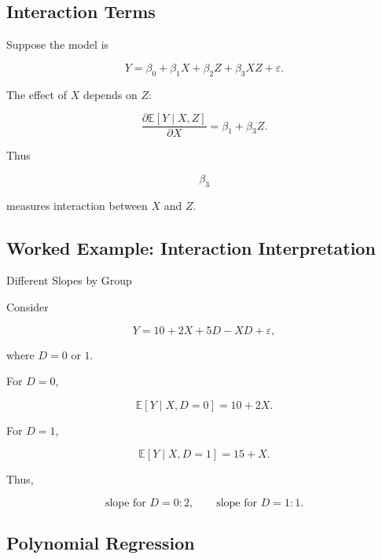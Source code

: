 \subsection{Interaction Terms}
\label{subsec:interaction-terms}

Suppose the model is

\[
\boxed{
Y
=
\beta_0
+
\beta_1X
+
\beta_2Z
+
\beta_3XZ
+
\varepsilon.
}
\]

The effect of \(X\) depends on \(Z\):

\[
\frac{
\partial
\mathbb{E}[Y\mid X,Z]
}{
\partial X
}
=
\boxed{
\beta_1+\beta_3Z.
}
\]

Thus

\[
\beta_3
\]

measures interaction between \(X\) and \(Z\).

\subsection{Worked Example: Interaction Interpretation}
\label{subsec:worked-interaction}

\begin{workedexamplebox}{Different Slopes by Group}

Consider

\[
Y
=
10
+
2X
+
5D
-
X D
+
\varepsilon,
\]

where \(D=0\) or \(1\).

For \(D=0\),

\[
\mathbb{E}[Y\mid X,D=0]
=
10+2X.
\]

For \(D=1\),

\[
\mathbb{E}[Y\mid X,D=1]
=
15+X.
\]

Thus,

\begin{answerbox}
\[
\boxed{
\text{slope for }D=0:2,
\qquad
\text{slope for }D=1:1.
}
\]
\end{answerbox}

\end{workedexamplebox}

\subsection{Polynomial Regression}
\label{subsec:polynomial-regression}

